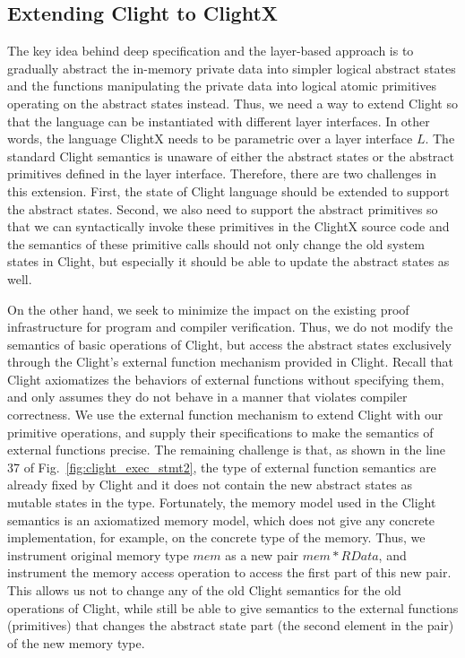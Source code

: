 \subsection{Extending Clight to ClightX}

The key idea behind deep specification and the layer-based approach
is to gradually abstract the in-memory private data into simpler logical
abstract states and the functions manipulating the private data
into logical atomic primitives operating on the abstract states instead.
Thus, we need a way to extend Clight so that the language can be instantiated
with different layer interfaces. In other words, the language ClightX
needs to be parametric over a layer interface $L$. 
The standard Clight semantics is unaware of either the
abstract states or the abstract primitives defined in the layer
interface. Therefore, there are two challenges
in this extension. First, the state of Clight language should be extended
to support the abstract states. Second, we also need to support
the abstract primitives so that we can syntactically invoke these primitives
in the ClightX source code and the semantics of these primitive calls
should not only change the old system states in Clight, but especially it
should be able to update the abstract states as well.

On the other hand, we seek to minimize the impact on the existing proof
infrastructure for program and compiler verification. Thus, we do not
modify the semantics of basic operations of Clight, but access the
abstract states exclusively through the Clight's external function
mechanism provided in Clight. Recall that
Clight axiomatizes the behaviors of external functions without
specifying them, and only assumes they do not behave in a manner that
violates compiler correctness. We use the external function mechanism
to extend Clight with our primitive operations, and supply their
specifications to make the semantics of external functions precise. 
The remaining challenge is that, as shown in the line 37 of
Fig.~\ref{fig:clight_exec_stmt2}, the type of external function semantics
are already fixed by Clight and it does not contain the new abstract states
as mutable states in the type. Fortunately, the memory model used in
the Clight semantics is an axiomatized memory model, which does not
give any concrete implementation, for example, on the concrete type
of the memory. Thus, we instrument original memory type $mem$ as a
new pair $mem * RData$, and instrument the memory access operation
to access the first part of this new pair. This allows us not to change
any of the old Clight semantics for the old operations of Clight,
while still be able to give semantics to the external functions (primitives)
that changes the abstract state part (the second element in the pair)
of the new memory type.

